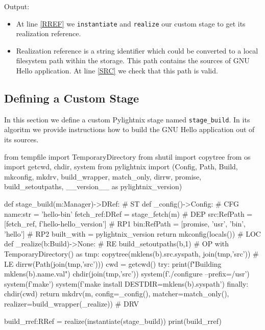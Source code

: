 Output:

\mysmallstdout

\begin{itemize}

  \item At line \ref{RREF} we \texttt{instantiate} and \texttt{realize} our
    custom stage to get its realization reference.

  \item Realization reference is a string identifier which could be converted to
    a local filesystem path within the storage. This path contains the sources
    of GNU Hello application. At line \ref{SRC} we check that this path is
    valid.

\end{itemize}

\pagebreak
\subsection{Defining a Custom Stage}

In this section we define a custom Pylightnix stage named \texttt{stage\_build}.
In its algoritm we provide instructions how to build the GNU Hello application
out of its sources.

\begin{pythontexcode}
from tempfile import TemporaryDirectory
from shutil import copytree
from os import getcwd, chdir, system
from pylightnix import (Config, Path, Build, mkconfig, mkdrv,
  build_wrapper, match_only, dirrw, promise, build_setoutpaths,
  __version__ as pylightnix_version)

def stage_build(m:Manager)->DRef:                            # ST \label{ST}
  def _config()->Config:                                     # CFG \label{CFG}
    name:str = 'hello-bin'
    fetch_ref:DRef = stage_fetch(m)                          # DEP \label{DEP}
    src:RefPath = [fetch_ref, f'hello-{hello_version}']      # RP1 \label{RP1}
    bin:RefPath = [promise, 'usr', 'bin', 'hello']           # RP2 \label{RP2}
    built_with = pylightnix_version
    return mkconfig(locals())                                # LOC \label{LOC}
  def _realize(b:Build)->None:                               # RE \label{RE}
    build_setoutpaths(b,1)                                   # OP \label{OP}
    with TemporaryDirectory() as tmp:
      copytree(mklens(b).src.syspath, join(tmp,'src'))       # LE \label{LE}
      dirrw(Path(join(tmp,'src')))
      cwd = getcwd()
      try:
        print(f"Building {mklens(b).name.val}")
        chdir(join(tmp,'src'))
        system(f'./configure --prefix=/usr')
        system(f'make')
        system(f'make install DESTDIR={mklens(b).syspath}')
      finally:
        chdir(cwd)
  return mkdrv(m, config=_config(),
                  matcher=match_only(),
                  realizer=build_wrapper(_realize))          # DRV \label{DRV}

build_rref:RRef = realize(instantiate(stage_build))
print(build_rref)
\end{pythontexcode}

